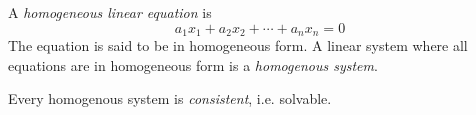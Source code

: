 \begin{definition}[Homogeneity]
A \emph{homogeneous linear equation} is
\begin{equation}
    a_1x_1 + a_2x_2 + \cdots + a_nx_n = 0
\end{equation}
The equation is said to be in homogeneous form.
A linear system where all equations are in homogeneous form is a \emph{homogenous system}.
\end{definition}
Every homogenous system is \emph{consistent}, i.e. solvable.